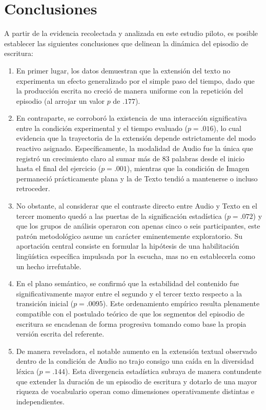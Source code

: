 \documentclass[12pt]{article}
\begin{document}
	\section{Conclusiones}
	
	A partir de la evidencia recolectada y analizada en este estudio piloto, es posible establecer las siguientes conclusiones que delinean la dinámica del episodio de escritura:
	
	\begin{enumerate}
		\item En primer lugar, los datos demuestran que la extensión del texto no experimenta un efecto generalizado por el simple paso del tiempo, dado que la producción escrita no creció de manera uniforme con la repetición del episodio (al arrojar un valor $p$ de $.177$).
		
		\item En contraparte, se corroboró la existencia de una interacción significativa entre la condición experimental y el tiempo evaluado ($p = .016$), lo cual evidencia que la trayectoria de la extensión depende estrictamente del modo reactivo asignado. Específicamente, la modalidad de Audio fue la única que registró un crecimiento claro al sumar más de 83 palabras desde el inicio hasta el final del ejercicio ($p = .001$), mientras que la condición de Imagen permaneció prácticamente plana y la de Texto tendió a mantenerse o incluso retroceder.
		
		\item No obstante, al considerar que el contraste directo entre Audio y Texto en el tercer momento quedó a las puertas de la significación estadística ($p = .072$) y que los grupos de análisis operaron con apenas cinco o seis participantes, este patrón metodológico asume un carácter eminentemente exploratorio. Su aportación central consiste en formular la hipótesis de una habilitación lingüística específica impulsada por la escucha, mas no en establecerla como un hecho irrefutable.
		
		\item En el plano semántico, se confirmó que la estabilidad del contenido fue significativamente mayor entre el segundo y el tercer texto respecto a la transición inicial ($p = .0095$). Este ordenamiento empírico resulta plenamente compatible con el postulado teórico de que los segmentos del episodio de escritura se encadenan de forma progresiva tomando como base la propia versión escrita del referente.
		
		\item De manera reveladora, el notable aumento en la extensión textual observado dentro de la condición de Audio no trajo consigo una caída en la diversidad léxica ($p = .144$). Esta divergencia estadística subraya de manera contundente que extender la duración de un episodio de escritura y dotarlo de una mayor riqueza de vocabulario operan como dimensiones operativamente distintas e independientes.
		

\end{enumerate}
\end{document}
